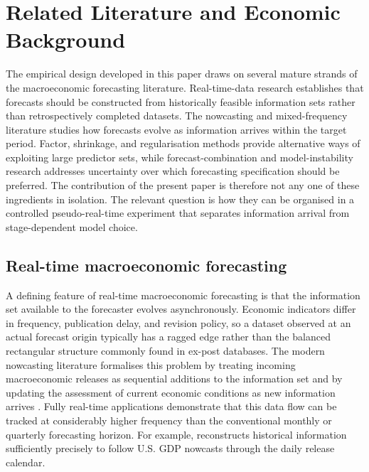 \section{Related Literature and Economic Background}
\label{sec:literature}

The empirical design developed in this paper draws on several mature strands of
the macroeconomic forecasting literature. Real-time-data research establishes
that forecasts should be constructed from historically feasible information
sets rather than retrospectively completed datasets. The nowcasting and
mixed-frequency literature studies how forecasts evolve as information arrives
within the target period. Factor, shrinkage, and regularisation methods provide
alternative ways of exploiting large predictor sets, while forecast-combination
and model-instability research addresses uncertainty over which forecasting
specification should be preferred. The contribution of the present paper is
therefore not any one of these ingredients in isolation. The relevant question
is how they can be organised in a controlled pseudo-real-time experiment that
separates information arrival from stage-dependent model choice.


\subsection{Real-time macroeconomic forecasting}
\label{subsec:lit_realtime}

A defining feature of real-time macroeconomic forecasting is that the
information set available to the forecaster evolves asynchronously. Economic
indicators differ in frequency, publication delay, and revision policy, so a
dataset observed at an actual forecast origin typically has a ragged edge rather
than the balanced rectangular structure commonly found in ex-post databases.
The modern nowcasting literature formalises this problem by treating incoming
macroeconomic releases as sequential additions to the information set and by
updating the assessment of current economic conditions as new information
arrives \citep{giannone2008nowcasting,banbura2013realtimeflow}. Fully real-time
applications demonstrate that this data flow can be tracked at considerably
higher frequency than the conventional monthly or quarterly forecasting
horizon. For example, \citet{liebermann2014realtime} reconstructs historical
information sufficiently precisely to follow U.S. GDP nowcasts through the
daily release calendar.

